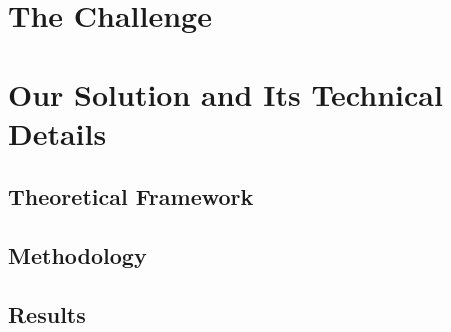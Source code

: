 \documentclass[letterpaper]{article} %
\begin{document}
\section{The Challenge}




\section{Our Solution and Its Technical Details}
\label{sec:solution}



\subsection{Theoretical Framework}
\label{sec:framework}

\subsection{Methodology}
\label{sec:methodology}

\subsection{Results}\label{results}
\end{document}
